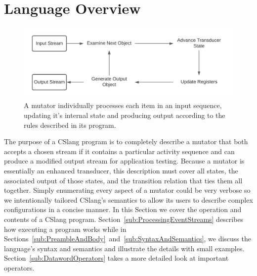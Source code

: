 \section{Language Overview}
\label{sec:Overview}

\begin{figure}
  \includegraphics[scale=.8]{images/processing}
  \caption{A mutator individually processes each item in an input
  sequence, updating it's internal state and producing output according
  to the rules described in its program.}
  \label{fig:Processing}
\end{figure}


The purpose
of a CSlang program is to completely describe a mutator
that both
accepts a chosen stream if it contains a particular
activity sequence and can produce a modified
output stream
for application testing.
Because a mutator is essentially an enhanced transducer,
this description must cover all states,
the associated output of those states,
and the transition
relation that ties them all together.
Simply enumerating every aspect of a mutator could be very verbose
so we intentionally tailored CSlang's semantics to allow its users to
describe complex configurations in a concise manner.
In this Section we cover the operation and contents of a CSlang program.
Section~\ref{sub:ProcessingEventStreams} describes how executing a program works
while
in Sections~\ref{sub:PreambleAndBody}~and~\ref{sub:SyntaxAndSemantics},
we discuss the
language's syntax and semantics and illustrate the details
with small examples.  Section~\ref{sub:DatawordOperators} takes a more
detailed look at important operators.

